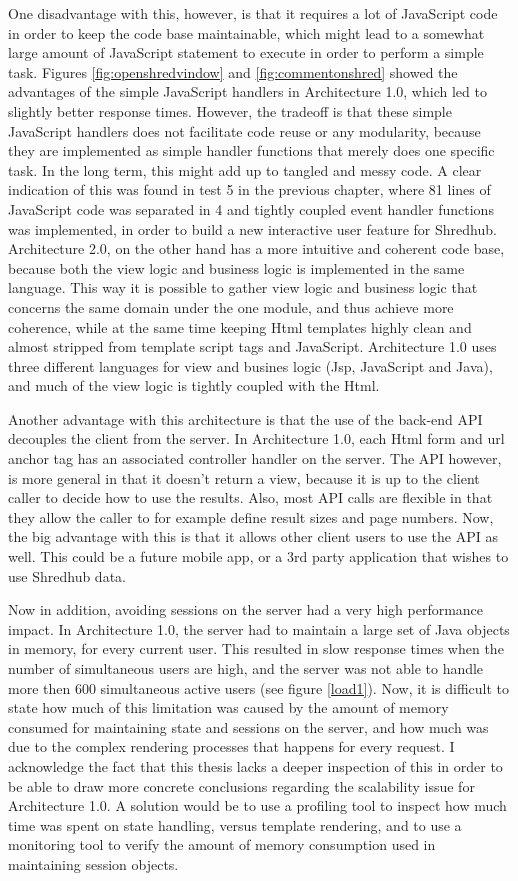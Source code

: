 One disadvantage with this, however, is that it requires a lot of JavaScript code in order to keep the code base maintainable, which might lead to a somewhat large amount of JavaScript statement to execute in order to perform a simple task. Figures \vref{fig:openshredvindow} and \vref{fig:commentonshred} showed the advantages of the simple JavaScript handlers in Architecture 1.0, which led to slightly better response times. However, the tradeoff is that these simple JavaScript handlers does not facilitate code reuse or any modularity, because they are implemented as simple handler functions that merely does one specific task. In the long term, this might add up to tangled and messy code. A clear indication of this was found in test 5 in the previous chapter, where 81 lines of JavaScript code was separated in 4 and tightly coupled event handler functions was implemented, in order to build a new interactive user feature for Shredhub. Architecture 2.0, on the other hand has a more intuitive and  coherent code base, because both the view logic and business logic is implemented in the same language. This way it is possible to gather view logic and business logic that concerns the same domain under the one module, and thus achieve more coherence, while at the same time keeping Html templates highly clean and almost stripped from template script tags and JavaScript. Architecture 1.0 uses three different languages for view and busines logic (Jsp, JavaScript and Java), and much of the view logic is tightly coupled with the Html. 

Another advantage with this architecture is that the use of the back-end API decouples the client from the server. In Architecture 1.0, each Html form and url anchor tag has an associated controller handler on the server. The API however, is more general in that it doesn't return a view, because it is up to the client caller to decide how to use the results. Also, most API calls are flexible in that they allow the caller to for example  define result sizes and page numbers. Now, the big advantage with this is that it allows other client users to use the API as well. This could be a future mobile app, or a  3rd party application that wishes to use Shredhub data.

Now in addition, avoiding sessions on the server had a very high performance impact. In Architecture 1.0, the server had to maintain a large set of Java objects in memory, for every current user. This resulted in slow response times when the number of simultaneous users are high, and the server was not able to handle more then 600 simultaneous active users (see figure \vref{load1}). Now, it is difficult to state how much of this limitation was caused by the amount of memory consumed for maintaining state and sessions on the server, and how much was due to the complex rendering processes that happens for every request. I acknowledge the fact that this thesis lacks a deeper inspection of this in order to be able to draw more concrete conclusions regarding the scalability issue for Architecture 1.0. A solution would be to use a profiling tool to inspect how much time was spent on state handling, versus template rendering, and to use a monitoring tool to verify the amount of memory consumption used in maintaining session objects.

